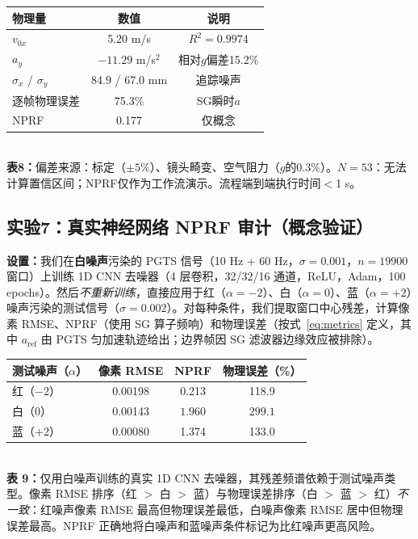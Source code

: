 \documentclass[9pt,twocolumn]{article}
\theoremstyle{remark}
\theoremstyle{definition}
\newcommand{\澔}{%
  \hbox{%
    \scalebox{0.75}[1]{氵}%
    \kern -0.3em%
    \scalebox{0.8}[1]{皓}%
  }%
}
\begin{document}
\begin{center}
    \scriptsize\setlength{\tabcolsep}{3.5pt}
    \begin{tabular}{lcc}
        \toprule
        \textbf{物理量} & \textbf{数值} & \textbf{说明} \\
        \midrule
        $v_{0x}$ & 5.20 m/s & $R^2=0.9974$ \\
        $a_y$ & $-11.29$ m/s$^2$ & 相对$g$偏差15.2\% \\
        $\sigma_x$ / $\sigma_y$ & 84.9 / 67.0 mm & 追踪噪声 \\
        逐帧物理误差 & 75.3\% & SG瞬时$a$ \\
        NPRF & 0.177 & 仅概念 \\
        \bottomrule
    \end{tabular}
    \\[0.5pt]
    {\scriptsize \textbf{表8：}偏差来源：标定（$\pm5\%$）、镜头畸变、空气阻力（$g$的0.3\%）。$N=53$：无法计算置信区间；NPRF仅作为工作流演示。流程端到端执行时间$<$1 s。}
\end{center}

\subsection{实验7：真实神经网络 NPRF 审计（概念验证）}

\textbf{设置：}我们在\textbf{白噪声}污染的 PGTS 信号（10 Hz + 60 Hz，$\sigma=0.001$，$n=19900$ 窗口）上训练 1D CNN 去噪器（4 层卷积，32/32/16 通道，ReLU，Adam，100 epochs）。然后\textit{不重新训练}，直接应用于红（$\alpha=-2$）、白（$\alpha=0$）、蓝（$\alpha=+2$）噪声污染的测试信号（$\sigma=0.002$）。对每种条件，我们提取窗口中心残差，计算像素 RMSE、NPRF（使用 SG 算子频响）和物理误差（按式~\eqref{eq:metrics} 定义，其中 $a_{\text{ref}}$ 由 PGTS 匀加速轨迹给出；边界帧因 SG 滤波器边缘效应被排除）。

\begin{center}
    \scriptsize\setlength{\tabcolsep}{3.5pt}
    \begin{tabular}{lccc}
        \toprule
        \textbf{测试噪声（$\alpha$）} & \textbf{像素 RMSE} & \textbf{NPRF} & \textbf{物理误差（\%）} \\
        \midrule
        红（$-$2） & 0.00198 & 0.213 & 118.9 \\
        白（0） & 0.00143 & $\mathbf{1.960}$ & $\mathbf{299.1}$ \\
        蓝（$+$2） & 0.00080 & 1.374 & 133.0 \\
        \bottomrule
    \end{tabular}
    \\[0.5pt]
    {\scriptsize \textbf{表 9：}仅用白噪声训练的真实 1D CNN 去噪器，其残差频谱依赖于测试噪声类型。像素 RMSE 排序（红 $>$ 白 $>$ 蓝）与物理误差排序（白 $>$ 蓝 $>$ 红）\textit{不一致}：红噪声像素 RMSE 最高但物理误差最低，白噪声像素 RMSE 居中但物理误差最高。NPRF 正确地将白噪声和蓝噪声条件标记为比红噪声更高风险。}
\end{center}
\end{document}
